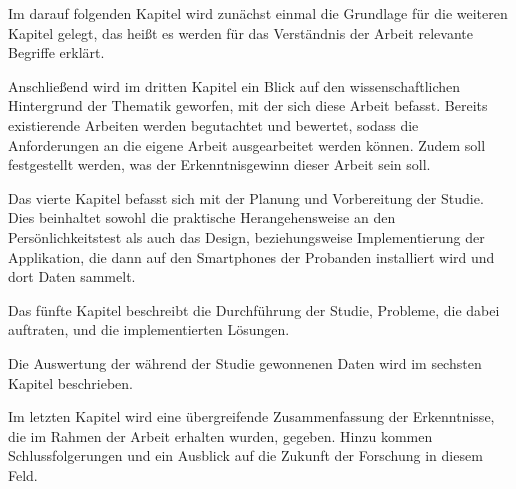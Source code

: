 Im darauf folgenden Kapitel wird zunächst einmal die Grundlage für die weiteren Kapitel gelegt, das heißt
es werden für das Verständnis der Arbeit relevante Begriffe erklärt.
\par


Anschließend wird im dritten Kapitel ein Blick auf den wissenschaftlichen Hintergrund der Thematik geworfen, mit der sich diese Arbeit befasst.
Bereits existierende Arbeiten werden begutachtet und bewertet, sodass die Anforderungen an die eigene Arbeit ausgearbeitet werden können.
Zudem soll festgestellt werden, was der Erkenntnisgewinn dieser Arbeit sein soll.
\par

Das vierte Kapitel befasst sich mit der Planung und Vorbereitung der Studie.
Dies beinhaltet sowohl die praktische Herangehensweise an den Persönlichkeitstest als auch das Design, beziehungsweise Implementierung der Applikation,
die dann auf den Smartphones der Probanden installiert wird und dort Daten sammelt. 

Das fünfte Kapitel beschreibt die Durchführung der Studie, Probleme, die dabei auftraten, und die implementierten Lösungen.

Die Auswertung der während der Studie gewonnenen Daten wird im sechsten Kapitel beschrieben.

Im letzten Kapitel wird eine übergreifende Zusammenfassung der Erkenntnisse, die im Rahmen der Arbeit erhalten wurden, gegeben.
Hinzu kommen Schlussfolgerungen und ein Ausblick auf die Zukunft der Forschung in diesem Feld.


